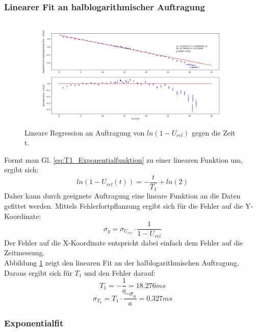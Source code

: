 \documentclass[12pt,a4paper]{article}
\begin{document}
\subsubsection{Linearer Fit an halblogarithmischer Auftragung}

\begin{figure}
\centering
\includegraphics[scale=0.4]{Bilder/T1_linFit_halblog.PNG}
\caption{Lineare Regression an Auftragung von $ln(1-U_{rel})$ gegen die Zeit t.}
\label{fig:T1_linFit}
\end{figure}

Formt man Gl. \ref{eq:T1_Exponentialfunktion} zu einer linearen Funktion um, ergibt sich:
\begin{equation}
ln(1 - U_{rel} (t)) = -\dfrac{t}{T_1} + ln(2)
\label{eq:T1_linFunktion}
\end{equation}
Daher kann durch geeignete Auftragung eine lineare Funktion an die Daten gefittet werden. Mittels Fehlerfortpflanzung ergibt sich für die Fehler auf die Y-Koordinate:
\begin{equation}
\sigma _y = \sigma _{U_{rel}} \cdot \dfrac{1}{1 - U_{rel}}
\end{equation}
Der Fehler auf die X-Koordinate entspricht dabei einfach dem Fehler auf die Zeitmessung.\\
Abbildung \ref{fig:T1_linFit} zeigt den linearen Fit an der halblogarithmischen Auftragung. Daraus ergibt sich für $T_1$ und den Fehler darauf:
\begin{equation*}
T_1 = -\dfrac{1}{a} = 18.276 ms
\end{equation*}
\begin{equation*}
\sigma _{T_1} = T_1 \cdot \dfrac{-\sigma _a}{a} = 0.327 ms
\end{equation*}

\subsubsection{Exponentialfit}
\end{document}
